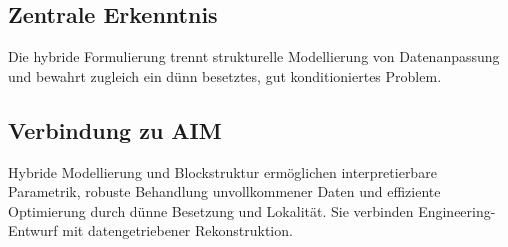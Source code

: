 \subsection{Zentrale Erkenntnis}
\begin{proposition}
Die hybride Formulierung trennt strukturelle Modellierung von Datenanpassung
und bewahrt zugleich ein dünn besetztes, gut konditioniertes Problem.
\end{proposition}

\subsection{Verbindung zu AIM}
\begin{summary}
Hybride Modellierung und Blockstruktur ermöglichen interpretierbare
Parametrik, robuste Behandlung unvollkommener Daten und effiziente Optimierung
durch dünne Besetzung und Lokalität. Sie verbinden Engineering-Entwurf mit
datengetriebener Rekonstruktion.
\end{summary}
